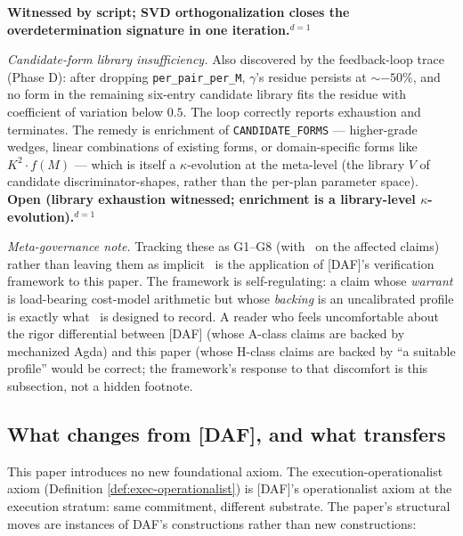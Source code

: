 \begin{description}[nosep,leftmargin=0.8cm]
    \textbf{Witnessed by script; SVD orthogonalization
    closes the overdetermination signature in one
    iteration.}$^{d=1}$
  \item[G9] \emph{Candidate-form library
    insufficiency.} Also discovered by the
    feedback-loop trace (Phase D): after dropping
    \verb|per_pair_per_M|, $\gamma$'s residue
    persists at $\sim -50\%$, and no form in the
    remaining six-entry candidate library fits the
    residue with coefficient of variation below $0.5$.
    The loop correctly reports exhaustion and
    terminates. The remedy is enrichment of
    \verb|CANDIDATE_FORMS| --- higher-grade wedges,
    linear combinations of existing forms, or
    domain-specific forms like $K^2 \cdot f(M)$ ---
    which is itself a $\kappa$-evolution at the
    meta-level (the library $V$ of candidate
    discriminator-shapes, rather than the
    per-plan parameter space). \textbf{Open (library
    exhaustion witnessed; enrichment is a library-level
    $\kappa$-evolution).}$^{d=1}$
\end{description}

\emph{Meta-governance note.} Tracking these as G1--G8
(with \gmark\ on the affected claims) rather than
leaving them as implicit \cmark\ is the application of
[DAF]'s verification framework to this paper. The
framework is self-regulating: a claim whose
\emph{warrant} is load-bearing cost-model arithmetic
but whose \emph{backing} is an uncalibrated profile is
exactly what \gmark\ is designed to record. A reader who
feels uncomfortable about the rigor differential
between [DAF] (whose \textsf{A}-class claims are backed
by mechanized Agda) and this paper (whose \textsf{H}-class
claims are backed by ``a suitable profile''
would be correct; the framework's response to that
discomfort is this subsection, not a hidden footnote.

\subsection{What changes from [DAF], and what transfers}

This paper introduces no new foundational axiom. The
execution-operationalist axiom
(Definition \ref{def:exec-operationalist}) is [DAF]'s
operationalist axiom at the execution stratum: same commitment,
different substrate. The paper's structural moves are
instances of DAF's constructions rather than new constructions:

